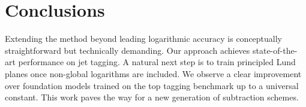 \section{Conclusions}\label{sec:conclusions}

Extending the method beyond leading logarithmic accuracy is conceptually
straightforward but technically demanding. Our approach achieves
state-of-the-art performance on jet tagging. A natural next step is to
train principled Lund planes once non-global logarithms are included. We
observe a clear improvement over foundation models trained on the top
tagging benchmark up to a universal constant. This work paves the way
for a new generation of subtraction schemes.

